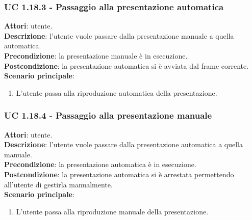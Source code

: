 	\subsubsection{UC 1.18.3 - Passaggio alla presentazione automatica}{
		\label{uc1.18.3}
		\textbf{Attori}: utente. \\
		\textbf{Descrizione}: l'utente vuole passare dalla presentazione manuale a quella automatica. \\
		\textbf{Precondizione}: la presentazione manuale è in esecuzione.	\\
		\textbf{Postcondizione}: la presentazione automatica si è avviata dal frame corrente.\\
		\textbf{Scenario principale}:
		\begin{enumerate}
			\item L'utente passa alla riproduzione automatica della presentazione.
		\end{enumerate}						
	}
	\subsubsection{UC 1.18.4 - Passaggio alla presentazione manuale}{
		\label{uc1.18.4}
		\textbf{Attori}: utente. \\
		\textbf{Descrizione}: l'utente vuole passare dalla presentazione automatica a quella manuale. \\
		\textbf{Precondizione}: la presentazione automatica è in esecuzione.	\\
		\textbf{Postcondizione}: la presentazione automatica si è arrestata permettendo all'utente di gestirla manualmente.\\
		\textbf{Scenario principale}:
		\begin{enumerate}
			\item L'utente passa alla riproduzione manuale della presentazione.
		\end{enumerate}						
	}